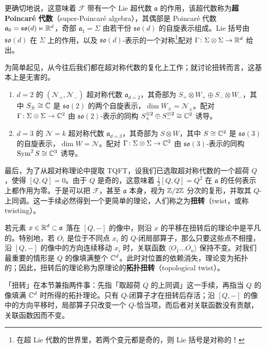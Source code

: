 更确切地说，这意味着 $\mathcal{F}$ 带有一个 Lie 超代数 $\mathfrak{a}$ 的作用，该超代数称为\textbf{超 Poincaré 代数}（super-Poincaré algebra），其偶部是 Poincaré 代数 $\mathfrak{a}_0=\mathfrak{so}(d)\ltimes \mathbb{R}^d$，奇部 $\mathfrak{a}_1=\Sigma$ 由若干份 $\mathfrak{so}(d)$ 的自旋表示组成。Lie 括号由 $\mathfrak{so}(d)$ 在 $\Sigma$ 上的作用，以及 $\mathfrak{so}(d)$-表示的一个对称\footnote{在超 Lie 代数的世界里，若两个变元都是奇的，则 Lie 括号是对称的！}配对 $\Gamma \colon \Sigma\otimes \Sigma\to \mathbb{R}^d$ 给出。

为简单起见，从今往后我们都在超对称代数的复化上工作；就讨论扭转而言，这基本上是无害的。
\begin{ex}\hfill
\begin{enumerate}
	\item $d=2$ 的 $(\mathcal N_+,\mathcal N_-)$ 超对称代数 $\mathfrak{a}_{d=2}$，其奇部为 $ S_+\otimes W_+\oplus S_-\otimes W_-$，其中 $S_\pm \cong \mathbb{C} $ 是 $\mathfrak{so}(2)$ 的两个自旋表示，$\dim W_\pm= \mathcal N_\pm$。配对 $\Gamma \colon \Sigma\otimes \Sigma\to \mathbb{C}^2$ 由 $\mathfrak{so}(2)$-表示的同构 $S_+^{\otimes 2} \oplus S_-^{\otimes 2} \cong \mathbb{C}^2$ 诱导。
	\item $d=3$ 的 $\mathcal N=k$ 超对称代数 $\mathfrak{a}_{d=3}$，其奇部为 $S \otimes W$，其中 $S\cong \mathbb{C}^2$ 是 $\mathfrak{so}(3)$ 的自旋表示，$\dim W=\mathcal N$。配对 $\Gamma \colon \Sigma\otimes \Sigma\to \mathbb{C}^3$ 由 $\mathfrak{so}(3)$-表示的同构 $ \operatorname{Sym}^2 S\cong \mathbb{C}^3$ 诱导。
\end{enumerate}	
\end{ex}

最后，为了从超对称理论中提取 TQFT，设我们已选取超对称代数的一个超荷 $Q$，使得 $[Q,Q]=0$。由于 $Q$ 是奇的，这意味着 $\frac{1}{2}[Q,Q]=Q^2$ 在 $\mathfrak{a}$ 的任何表示上都作用为零。于是可以把 $\mathcal{F}$，甚至 $\mathfrak{a}$ 本身，视为 $\mathbb{Z}/2\mathbb{Z}$ 分次的复形，并取其 $Q$-上同调。这一手续必然得到一个更简单的理论，人们称之为\textbf{扭转}（twist，或称 twisting）。

若元素 $x\in \mathbb{R}^d\subset \mathfrak{a}$ 落在 $[Q,-]$ 的像中，则沿 $x$ 的平移在扭转后的理论中是平凡的。特别地，若 $O_i$ 是位于不同点 $x_i$ 的 $Q$-闭局部算子，那么只要这些点不相撞，沿 $[Q,-]$ 的像中的方向连续移动 $x_i$ 时，关联函数 $\langle O_1\dots O_n\rangle$ 保持不变。对我们最重要的情形是 $Q$ 的像填满整个 $\mathbb{C}^d$。此时对位置的依赖消失，理论变为拓扑的；因此，扭转后的理论称为原理论的\textbf{拓扑扭转}（topological twist）。

\begin{yizhu}[「扭转」兼指手续与结果]
「扭转」在本节兼指两件事：先指「取超荷 $Q$ 的上同调」这一手续，再指当 $Q$ 的像填满 $\mathbb{C}^d$ 时所得的拓扑理论。只有 $Q$-闭算子才在扭转后存活；沿 $[Q,-]$ 的像中的方向平移时，局部算子只改变一个 $Q$-恰当项，而后者对关联函数没有贡献，关联函数因而不变。
\end{yizhu}

